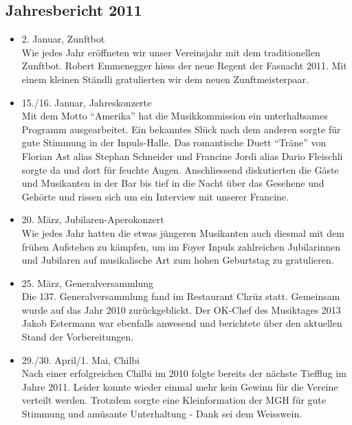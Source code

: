 \subsection{Jahresbericht 2011}
\begin{history}


    \begin{itemize}

        \item[]2. Januar, Zunftbot\\
        Wie jedes Jahr eröffneten wir unser Vereinsjahr mit dem traditionellen
        Zunftbot. Robert Emmenegger hiess der neue Regent der Fasnacht 2011. Mit
        einem kleinen Ständli gratulierten wir dem neuen Zunftmeisterpaar.

        \item[]15./16. Januar, Jahreskonzerte\\
        Mit dem Motto \enquote{Amerika} hat die Musikkommission ein unterhaltsames
        Programm ausgearbeitet. Ein bekanntes Slück nach dem anderen sorgte für
        gute Stimmung in der Inpuls-Halle. Das romantische Duett \enquote{Träne} von
        Florian Ast alias Stephan Schneider und Francine Jordi alias Dario
        Fleischli sorgte da und dort für feuchte Augen. Anschliessend
        diskutierten die Gäste und Musikanten in der Bar bis tief in die Nacht
        über das Gesehene und Gehörte und rissen sich um ein Interview mit
        unserer Francine.

        \item[]20. März, Jubilaren-Aperokonzert\\
        Wie jedes Jahr hatten die etwas jüngeren Musikanten auch diesmal mit dem
        frühen Aufstehen zu kämpfen, um im Foyer Inpuls zahlreichen Jubilarinnen
        und Jubilaren auf musikalische Art zum hohen Geburtstag zu gratulieren.

        \item[]25. März, Generalversammlung\\
        Die 137. Generalversammlung fand im Restaurant Chrüz statt. Gemeinsam
        wurde auf das Jahr 2010 zurückgeblickt. Der OK-Chef des Musiktages 2013
        Jakob Estermann war ebenfalls anwesend und berichtete über den aktuellen
        Stand der Vorbereitungen.

        \item[]29./30. April/1. Mai, Chilbi\\
        Nach einer erfolgreichen Chilbi im 2010 folgte bereits der nächste
        Tiefflug im Jahre 2011. Leider konnte wieder einmal mehr kein Gewinn für
        die Vereine verteilt werden. Trotzdem sorgte eine Kleinformation der MGH
        für gute Stimmung und amüsante Unterhaltung - Dank sei dem Weisswein.


\end{itemize}
\end{history}
